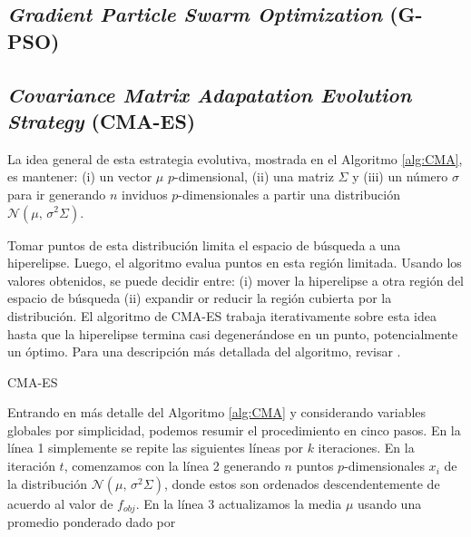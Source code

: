 \subsection{\emph{Gradient Particle Swarm Optimization} (G-PSO)}


\subsection{\emph{Covariance Matrix Adapatation Evolution Strategy} (CMA-ES)}


La idea general de esta estrategia evolutiva, mostrada en el Algoritmo
\ref{alg:CMA}, es mantener:
(i) un vector $\mu$ $p$-dimensional,
(ii) una matriz $\Sigma$ y
(iii) un número $\sigma$ para ir generando $n$ inviduos $p$-dimensionales
a partir una distribución $\mathcal{N}(\mu,\,\sigma^{2} \Sigma)$.


Tomar puntos de esta distribución limita el espacio de búsqueda a una
hiperelipse.
Luego, el algoritmo evalua puntos en esta región limitada.
Usando los valores obtenidos, se puede decidir entre:
(i) mover la hiperelipse a otra región del espacio de búsqueda
(ii) expandir or reducir la región cubierta por la distribución.
El algoritmo de CMA-ES trabaja iterativamente sobre esta idea hasta que la
hiperelipse termina casi degenerándose en un punto, 
potencialmente un óptimo.
Para una descripción más detallada del algoritmo, revisar \citep{Mykel2019, Hansen2016}.

\begin{algorithm}
{}
\caption{CMA-ES}
\label{alg:CMA}
\end{algorithm}

Entrando en más detalle del Algoritmo \ref{alg:CMA} y considerando variables
globales por simplicidad, podemos resumir el procedimiento en cinco pasos.
En la línea 1 simplemente se repite las siguientes líneas por $k$ iteraciones.
En la iteración $t$, comenzamos con la línea 2 generando $n$ puntos
$p$-dimensionales $x_i$ de la distribución $\mathcal{N}(\mu,\,\sigma^{2} \Sigma)$, 
donde estos son ordenados descendentemente de acuerdo
al valor de $f_{obj}$.
En la línea 3 actualizamos la media $\mu$ usando una promedio ponderado dado
por

